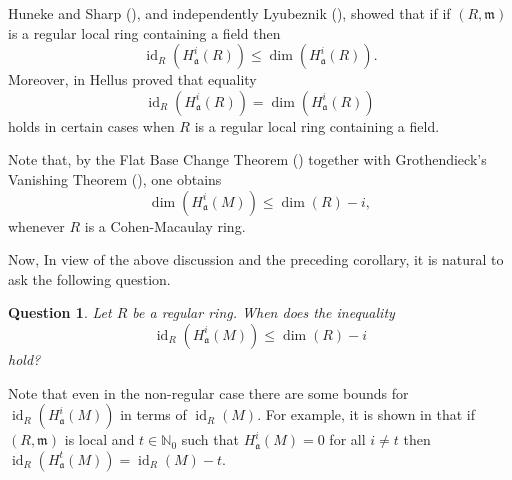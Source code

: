 \documentclass[12pt,twoside, final]{amsart}
\numberwithin{equation}{section}
\newtheorem{qu}[thm]{Question}
\newtheorem{nota rem}[thm]{Notation and Remark}
\newtheorem{defen rem}[thm]{Definition and Remark}
\def\id{\operatorname{id}}
\def\dim{\operatorname{dim}}
\newcommand{\fa}{\mathfrak{a}}
\newcommand{\m}{\mathfrak{m}}
\newcommand{\NN}{\mathbb{N}}
\begin{document}
  Huneke and   Sharp (\cite{hu}), and independently   Lyubeznik (\cite{lyu2}), showed that if 
if $(R, \m)$ is a regular local ring containing a field then \[\id_{R}(H^i_{\fa}(R))\leq \dim(H^i_{\fa}(R)).\]
Moreover, in \cite{he} Hellus proved that equality \[\id_{R}(H^i_{\fa}(R))= \dim(H^i_{\fa}(R))\] holds in certain cases when 
$R$ is a regular local ring containing a field.
 
 Note that, by the Flat Base Change Theorem (\cite[Theorem 4. 3. 2]{bsh}) together with  Grothendieck’s Vanishing Theorem (\cite[Theorem . 1. 2]{bsh}), one obtains \[\dim(H^i_{\fa}(M))\leq \dim(R)- i,\] whenever $R$  is a Cohen-Macaulay ring. 
 
Now, In view of the above discussion and the preceding corollary, it is natural to ask the following question.
\begin{qu}
     Let 
$R$ be a regular ring. When does the inequality \[\id_{R}(H^i_{\fa}(M))\leq   \dim(R)- i\] hold?
\end{qu}
Note that even in the non-regular case there are some   bounds for $\id_{R}(H^i_{\fa}(M))$ in terms of $\id_{R}(M)$. For example, it is shown in \cite{va}  that if $(R, \m)$ is local and $t\in \NN_0$ such that $H^i_{\fa}(M)=0$ for all $i\neq t$ then $\id_{R}(H^t_{\fa}(M))= \id_{R}(M)- t.$
\end{document}
